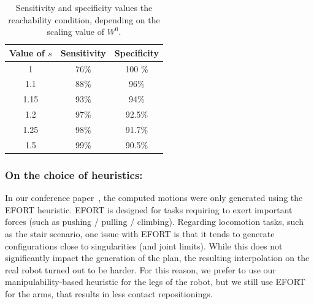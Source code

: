 \begin{table}
\centering
\footnotesize
\begin{tabular}{c | c | c}
   Value of $s$ &  Sensitivity & Specificity\\
 \hline
   1   & 76\% & 100 \%\\
   1.1& 88\% & 96\% \\
   1.15& 93\% & 94\%\\
   1.2 & 97\% & 92.5\%\\
   1.25& 98\% & 91.7\%\\
   1.5 & 99\% & 90.5\%\\
 \end{tabular}
\caption{Sensitivity and specificity values the reachability condition, depending on the scaling value of $W^0$.}
\label{tab:scale}
\quad
\end{table}

\subsubsection{On the choice of heuristics:} \label{sec:heuristichoices}
In our conference paper~\citep{tonneauisrr15}, the computed motions were only generated using the EFORT heuristic.
EFORT is designed for tasks requiring to exert important forces (such as pushing / pulling / climbing). 
Regarding locomotion tasks, such as the stair scenario, one issue with EFORT is that it tends to generate
configurations close to singularities (and joint limits). While this does not significantly impact
the generation of the plan, the resulting interpolation on the real robot turned out to be harder.
For this reason, we prefer to use our manipulability-based heuristic for the legs of the robot, but we still
use EFORT for the arms, that results in less contact repositionings.


